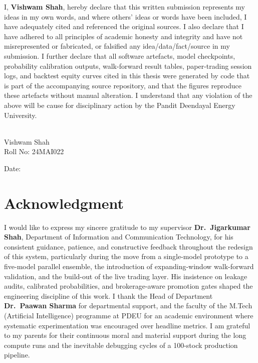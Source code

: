     I, \textcolor{internationalkleinblue}{\textbf{Vishwam Shah}}, hereby declare that this written submission represents my ideas in my own words, and where others' ideas or words have been included, I have adequately cited and referenced the original sources. I also declare that I have adhered to all principles of academic honesty and integrity and have not misrepresented or fabricated, or falsified any idea/data/fact/source in my submission. I further declare that all software artefacts, model checkpoints, probability calibration outputs, walk-forward result tables, paper-trading session logs, and backtest equity curves cited in this thesis were generated by code that is part of the accompanying source repository, and that the figures reproduce these artefacts without manual alteration. I understand that any violation of the above will be cause for disciplinary action by the Pandit Deendayal Energy University.
    \vspace{0.8cm}
    \vspace{0.8cm}
    \begin{flushright}
        \makebox[1.8in]{\hrulefill}\\
        Vishwam Shah\\
        Roll No: 24MAI022\\
    \end{flushright}
    \vfill
    \begin{flushleft}
	    Date: \makebox[1.8in]{\hrulefill}
    \end{flushleft}

    \newpage
    \thispagestyle{empty}
    \section*{\textbf{Acknowledgment}}
    I would like to express my sincere gratitude to my supervisor \textbf{Dr.\ Jigarkumar Shah}, Department of Information and Communication Technology, for his consistent guidance, patience, and constructive feedback throughout the redesign of this system, particularly during the move from a single-model prototype to a five-model parallel ensemble, the introduction of expanding-window walk-forward validation, and the build-out of the live trading layer. His insistence on leakage audits, calibrated probabilities, and brokerage-aware promotion gates shaped the engineering discipline of this work. I thank the Head of Department \textbf{Dr.\ Paawan Sharma} for departmental support, and the faculty of the M.Tech (Artificial Intelligence) programme at PDEU for an academic environment where systematic experimentation was encouraged over headline metrics. I am grateful to my parents for their continuous moral and material support during the long compute runs and the inevitable debugging cycles of a 100-stock production pipeline.

